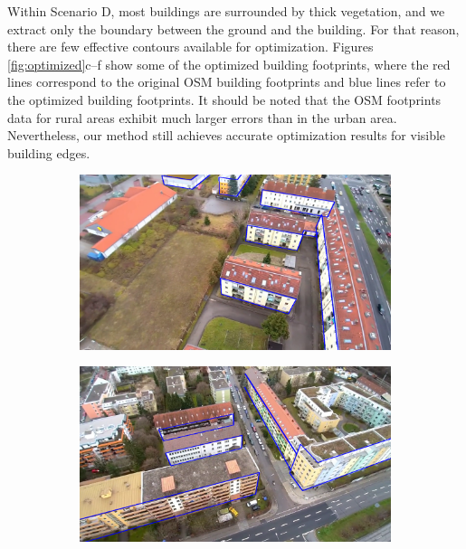 \documentclass[remotesensing,article,accept,moreauthors,pdftex,10pt,a4paper]{mdpi}
\theoremstyle{mdpi}
\newcounter{ex}
\newcounter{re}
\begin{document}
Within Scenario D, most buildings are surrounded by thick vegetation, and we extract only the boundary between the ground and the building. For that reason, there are few effective contours available for optimization. Figures \ref{fig:optimized}c--f show some of the optimized building footprints, where the red lines correspond to the original OSM building footprints and blue lines refer to the optimized building footprints. It should be noted that the OSM footprints data for rural areas exhibit much larger errors than in the urban area. Nevertheless, our method still achieves accurate optimization results for visible building edges.



\begin{figure}[H]
    \centering
       \begin{subfigure}[tbp]{0.48\columnwidth}
           \centering
           \includegraphics[width=\textwidth]{optimize/mil_alloptim_1.png}
           \caption[]{}
           {{\small }}
           \label{fig:7a}
       \end{subfigure}
       \hfill
       \begin{subfigure}[tbp]{0.48\columnwidth}
           \centering
           \includegraphics[width=\textwidth]{optimize/mil_alloptim_2.png}

\end{subfigure}
\end{figure}
\end{document}
